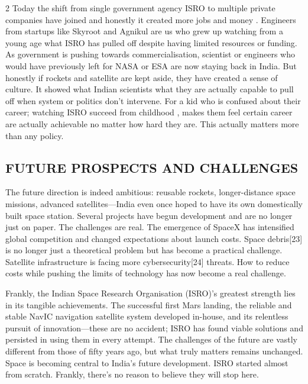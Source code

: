 \begin{multicols}{2}
  Today the shift from single government agency ISRO to multiple private companies have joined and
  honestly it created more jobs and money . Engineers from startups like Skyroot and Agnikul are us who
  grew up watching from a young age what ISRO has pulled off despite having limited resources or
  funding. As government is pushing towards commercialisation, scientist or engineers who would have
  previously left for NASA or ESA are now staying back in India. But honestly if rockets and satellite are
  kept aside, they have created a sense of culture. It showed what Indian scientists what they are actually
  capable to pull off when system or politics don’t intervene. For a kid who is confused about their career;
  watching ISRO succeed from childhood , makes them feel certain career are actually achievable no
  matter how hard they are. This actually matters more than any policy.

  \subsection*{\centering\uppercase{FUTURE PROSPECTS AND CHALLENGES}}
  The future direction is indeed ambitious: reusable rockets, longer-distance space missions, advanced
  satellites—India even once hoped to have its own domestically built space station. Several projects have
  begun development and are no longer just on paper. The challenges are real. The emergence of SpaceX
  has intensified global competition and changed expectations about launch costs. Space debris[23] is no
  longer just a theoretical problem but has become a practical challenge. Satellite infrastructure is facing
  more cybersecurity[24] threats. How to reduce costs while pushing the limits of technology has now
  become a real challenge.

  \par\noindent
  Frankly, the Indian Space Research Organisation (ISRO)'s greatest strength lies in its tangible
  achievements. The successful first Mars landing, the reliable and stable NavIC navigation satellite
  system developed in-house, and its relentless pursuit of innovation—these are no accident; ISRO has
  found viable solutions and persisted in using them in every attempt. The challenges of the future are
  vastly different from those of fifty years ago, but what truly matters remains unchanged. Space is
  becoming central to India's future development. ISRO started almost from scratch. Frankly, there's no
  reason to believe they will stop here.


\end{multicols}
